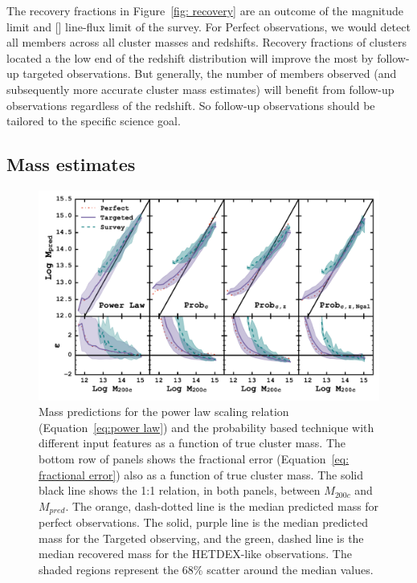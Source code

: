 The recovery fractions in Figure~\ref{fig: recovery} are an outcome of the magnitude limit and \hbox{[]} line-flux limit of the survey. For Perfect observations, we would detect all members across all cluster masses and redshifts. Recovery fractions of clusters located a the low end of the redshift distribution will improve the most by follow-up targeted observations. But generally, the number of members observed (and subsequently more accurate cluster mass estimates) will benefit from follow-up observations regardless of the redshift. So follow-up observations should be tailored to the specific science goal.

\subsection{Mass estimates}
\begin{figure}[t]
	\begin{center}
		\includegraphics[width=\textwidth]{figures1/Probcomparison.pdf} 
	\end{center}
	\caption[Probability based cluster mass predictions.]{Mass predictions for the power law scaling relation (Equation~\ref{eq:power law}) and the probability based technique with different input features as a function of true cluster mass. The bottom row of panels shows the fractional error (Equation~\ref{eq: fractional error}) also as a function of true cluster mass. The solid black line shows the 1:1 relation, in both panels, between $M_{200c}$ and $M_{pred}$. The orange, dash-dotted line is the median predicted mass for perfect observations. The solid, purple line is the median predicted mass for the Targeted observing, and the green, dashed line is the median recovered mass for the HETDEX-like observations. The shaded regions represent the 68\% scatter around the median values.}
	 \label{fig:Probability comparison} 
\end{figure}


